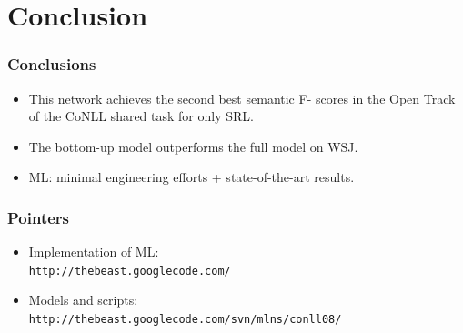 \documentclass{beamer} \setbeamertemplate{navigation symbols}{}
\begin{document}
\section{Conclusion}
\begin{frame}
  \frametitle{Conclusions}

  \begin{itemize}
  \item This network achieves the second best semantic F- scores in
    the Open Track of the CoNLL shared task for only SRL.  \bigskip
  \item The bottom-up model outperforms the full model on WSJ.
  \item ML: minimal engineering efforts + state-of-the-art results.
  \end{itemize}
\end{frame}

\begin{frame}
  \frametitle{Pointers}

  \begin{itemize}
  \item Implementation of ML:\\
    \texttt{http://thebeast.googlecode.com/} \bigskip
  \item Models and scripts:\\
    \texttt{http://thebeast.googlecode.com/svn/mlns/conll08/}
  \end{itemize}
\end{frame}
\end{document}
